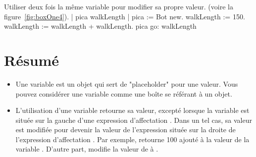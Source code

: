 \documentclass[a4paper,10pt,twoside]{book}
\begin{document}
\begin{script}[incr10]{Utiliser deux fois la m\^eme variable pour modifier sa propre valeur. (voire la figure~\ref{fig:boxOne4}).}
	| pica walkLength | 
	pica := Bot new. 
	walkLength := 150. 
	walkLength := walkLength + walkLength. 
	pica go: walkLength 
\end{script}


\section*{R\'esum\'e}

\begin{itemize}
\item Une variable est un objet qui sert de "placeholder" pour une valeur. Vous pouvez consid\'erer une variable comme une bo\^ite se r\'ef\'erant \`a un objet.

\item L'utilisation d'une variable retourne sa valeur, except\'e lorsque la variable est situ\'ee sur la gauche d'une expression d'affectation \ct{:=}. Dans un tel cas, sa valeur est modifi\'ee pour devenir la valeur de l'expression situ\'ee sur la droite de l'expression d'affectation \ct{:=}. Par exemple,  retourne 100 ajout\'e \`a la valeur de la variable . D'autre part,  modifie la valeur de  \`a . 

\end{itemize}
\ifx\wholebook\relax\else
    
\end{document}
